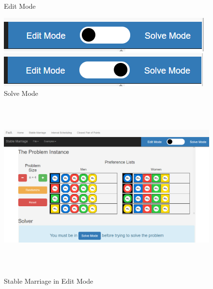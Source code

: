 %
\begin{figure}[h]
	\caption{Edit Mode}
	\label{fig-edit-mode}
	\includegraphics[]{images/edit-mode.png}
	\centering
	\caption{Solve Mode}
	\label{fig-solve-mode}
	\includegraphics[]{images/solve-mode.png}
	\centering
\end{figure}
%
\begin{figure}[h]
	\caption{Stable Marriage in Edit Mode}
	\includegraphics[height=3.5in]
	{images/stable-marriage-edit.png}
	\label{fig-stable-marriage-edit}
	\centering
\end{figure}
%